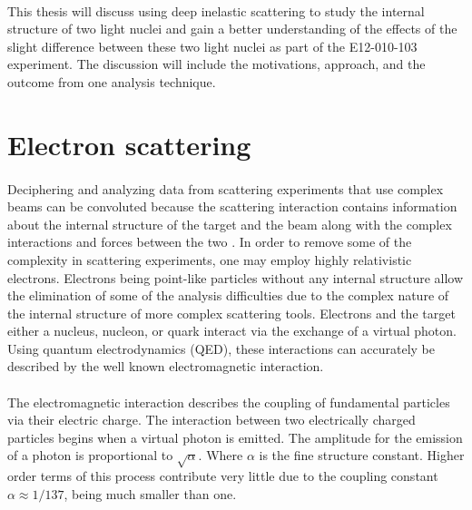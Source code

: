 \paragraph{}This thesis will discuss using deep inelastic scattering to study the internal structure of two light nuclei and gain a better understanding of the effects of the slight difference between these two light nuclei as part of the E12-010-103 experiment. The discussion will include the motivations, approach, and the outcome from one analysis technique.

\section{Electron scattering}\label{sec:escat}
\paragraph{}Deciphering and analyzing data from scattering experiments that use complex beams can be convoluted because the scattering interaction contains information about the internal structure of the target and the beam along with the complex interactions and forces between the two \cite{PnN}.  In order to remove some of the complexity in scattering experiments, one may employ highly relativistic electrons. Electrons being point-like particles without any internal structure allow the elimination of some of the analysis difficulties due to the complex nature of the internal structure of more complex scattering tools. Electrons and the target either a nucleus, nucleon, or quark interact via the exchange of a virtual photon. Using quantum electrodynamics (QED), these interactions can accurately be described by the well known electromagnetic interaction.
\paragraph{}The electromagnetic interaction describes the coupling of fundamental particles via their electric charge. The interaction between two electrically charged particles begins when a virtual photon is emitted. The amplitude for the emission of a photon is proportional to $\sqrt{\alpha}$. Where $\alpha$ is the fine structure constant. Higher order terms of this process contribute very little due to the coupling constant $\alpha \approx 1/137 $, being much smaller than one. 
